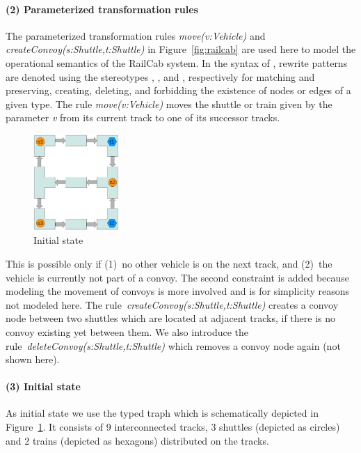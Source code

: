 \paragraph{(2) Parameterized transformation rules}
The parameterized transformation rules \textsf{\textit{move(v:Vehicle)}} and \textsf{\textit{createConvoy(s:Shuttle,t:Shuttle)}} in Figure~\ref{fig:railcab} are used here to model the operational semantics of the RailCab system. In the syntax of \henshin, rewrite patterns are denoted using the stereotypes \textcolor{darkgray}{}, \textcolor{mygreen}{}, \textcolor{myred}{} and \textcolor{myblue}{}, respectively for matching and preserving, creating, deleting, and forbidding the existence of nodes or edges of a given type. The rule \textsf{\textit{move(v:Vehicle)}} moves the shuttle or train given by the parameter \textsf{\textit{v}} from its current track to one of its successor tracks. 
\begin{figure}
  \vspace{-5mm}
  \begin{center}
    \includegraphics[width=3.25cm]{images/system}
  \end{center}
  \vspace{-5mm}
  \caption{Initial state}
  \label{fig:system}
  \vspace{-8mm}
\end{figure}
This is possible only if (1)~no other vehicle is on the next track, and (2)~the vehicle is currently not part of a convoy. The second constraint is added because modeling the movement of convoys is more involved and is for simplicity reasons not modeled here. The rule~\textsf{\textit{createConvoy(s:Shuttle,t:Shuttle)}} creates a convoy node between two shuttles which are located at adjacent tracks, if there is no convoy existing yet between them. We also introduce the rule~\textsf{\textit{deleteConvoy(s:Shuttle,t:Shuttle)}} which removes a convoy node again (not shown here).

\halflineup
\paragraph{(3) Initial state}
As initial state we use the typed traph which is schematically depicted in Figure~\ref{fig:system}. It consists of 9 interconnected tracks, 3 shuttles (depicted as circles) and 2 trains (depicted as hexagons) distributed on the tracks.

